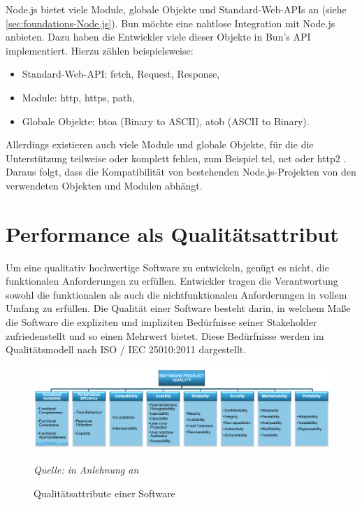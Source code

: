 \noindent
Node.js bietet viele Module, globale Objekte und Standard-Web-APIs an (siehe \autoref{sec:foundations-Node.js}). Bun möchte eine nahtlose Integration mit Node.js anbieten. Dazu haben die Entwickler viele dieser Objekte in Bun's API implementiert. Hierzu zählen beispielsweise:
\begin{itemize}
	\item Standard-Web-API: \glq fetch\grq{}, \glq Request\grq{}, \glq Response\grq{},
	\item Module: \glq http\grq{}, \glq https\grq{}, \glq path\grq{},
	\item Globale Objekte: \glq btoa\grq{} (Binary to ASCII), \glq atob\grq{} (ASCII to Binary).\cite{OvenSh.2023c}
\end{itemize} 

\noindent
Allerdings existieren auch viele Module und globale Objekte, für die die Unterstützung teilweise oder komplett fehlen, zum Beispiel \glq tel\grq{}, \glq net\grq{} oder \glq http2\grq{} \cite{OvenSh.2023c}. Daraus folgt, dass die Kompatibilität von bestehenden Node.js-Projekten von den verwendeten Objekten und Modulen abhängt.

\section{Performance als Qualitätsattribut} \label{sec:foundations-Performance}
Um eine qualitativ hochwertige Software zu entwickeln, genügt es nicht, die funktionalen Anforderungen zu erfüllen. Entwickler tragen die Verantwortung sowohl die funktionalen als auch die nichtfunktionalen Anforderungen in vollem Umfang zu erfüllen. Die Qualität einer Software besteht darin, in welchem Maße die Software die expliziten und impliziten Bedürfnisse seiner Stakeholder zufriedenstellt und so einen Mehrwert bietet. Diese Bedürfnisse werden im Qualitätsmodell nach ISO / IEC 25010:2011 dargestellt.\cite{.2022}\\

\begin{figure}[h]
	\centering
	\includegraphics[width=\linewidth]{./images/iso25010.png}
	\caption{Qualitätsattribute einer Software}
	\label{fig:softwareQuality}
	\textit{Quelle: in Anlehnung an \cite{.2022}}
\end{figure}

